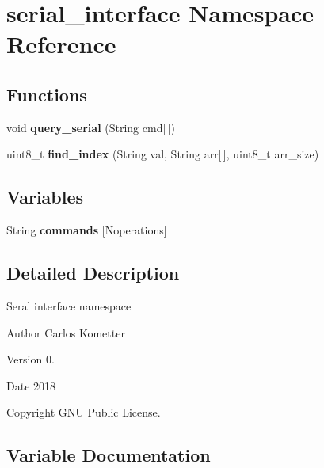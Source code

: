 \hypertarget{namespaceserial__interface}{}\section{serial\+\_\+interface Namespace Reference}
\label{namespaceserial__interface}
\subsection*{Functions}
\begin{DoxyCompactItemize}
\item 
\mbox{\label{namespaceserial__interface_a0651bd2556fe2b10eb198ebc326e5df6}} 
void {\bfseries query\+\_\+serial} (String cmd\mbox{[}$\,$\mbox{]})
\item 
\mbox{\label{namespaceserial__interface_ab94c5e9ba7baafc049338ac71bd15dfb}} 
uint8\+\_\+t {\bfseries find\+\_\+index} (String val, String arr\mbox{[}$\,$\mbox{]}, uint8\+\_\+t arr\+\_\+size)
\end{DoxyCompactItemize}
\subsection*{Variables}
\begin{DoxyCompactItemize}
\item 
String {\bfseries commands} \mbox{[}Noperations\mbox{]}
\end{DoxyCompactItemize}


\subsection{Detailed Description}
Seral interface namespace \begin{DoxyAuthor}{Author}
Carlos Kometter 
\end{DoxyAuthor}
\begin{DoxyVersion}{Version}
0. 
\end{DoxyVersion}
\begin{DoxyDate}{Date}
2018 
\end{DoxyDate}
\begin{DoxyCopyright}{Copyright}
G\+NU Public License. 
\end{DoxyCopyright}


\subsection{Variable Documentation}
\mbox{\label{namespaceserial__interface_a66e5350a4af824437ebba5a1d96a012c}} 
